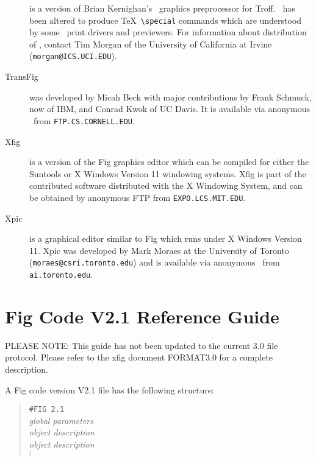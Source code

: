 \begin{description}
\item[\tpic]
	is a version of Brian Kernighan's \PIC\ graphics preprocessor
	for Troff.
\tpic\ has been altered to produce \TeX\ {\verb|\special|} commands which
	are understood by some \DVI\ print drivers and previewers.
For information about distribution of \tpic, contact Tim Morgan of
	the University of California at Irvine ({\tt morgan@ICS.UCI.EDU}).

\item[TransFig]
	was developed by Micah Beck with major contributions
	by Frank Schmuck, now of IBM, and Conrad Kwok of UC Davis.
	It is available via anonymous \FTP\ from {\tt FTP.CS.CORNELL.EDU}.

\item[Xfig]
	is a version of the Fig graphics editor which can be compiled for
	either the Suntools or X Windows Version 11 windowing systems.
Xfig is part of the contributed software distributed with the X Windowing
	System, and can be obtained by anonymous FTP from 
	{\tt EXPO.LCS.MIT.EDU}.

\item[Xpic]
	is a graphical editor similar to Fig which runs under X Windows
	Version 11.
Xpic was developed by Mark Moraes at the University of Toronto
	({\tt moraes@csri.toronto.edu}) and is available via anonymous
	\FTP\ from {\tt ai.toronto.edu}.

\end{description}

\raggedbottom
\pagebreak

\appendix

\section{Fig Code V2.1 Reference Guide}
\label{s:guide}

PLEASE NOTE:  This guide has not been updated to the current 3.0 file
protocol.  Please refer to the xfig document FORMAT3.0 for a complete
description.

A Fig code version V2.1 file has the following structure:
%
\begin{quote}
\begin{tabbing}
\verb|#FIG 2.1|			\\
\it global parameters	  	\\
\it object description	 	\\
\it object \= \it description 	\\
\> $\vdots$
\end{tabbing}
\end{quote}
%
